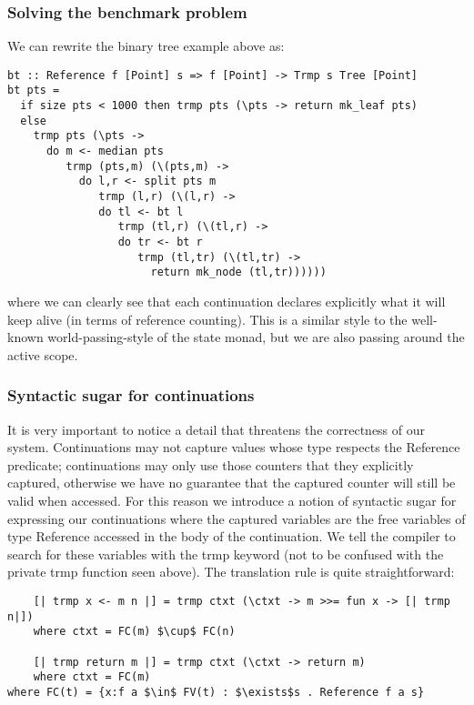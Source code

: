 \subsubsection{Solving the benchmark problem}

We can rewrite the binary tree example above as:

\begin{lstlisting}
bt :: Reference f [Point] s => f [Point] -> Trmp s Tree [Point]
bt pts =
  if size pts < 1000 then trmp pts (\pts -> return mk_leaf pts)
  else
    trmp pts (\pts ->
      do m <- median pts
         trmp (pts,m) (\(pts,m) ->
           do l,r <- split pts m
              trmp (l,r) (\(l,r) -> 
              do tl <- bt l
                 trmp (tl,r) (\(tl,r) ->
                 do tr <- bt r
                    trmp (tl,tr) (\(tl,tr) ->
                      return mk_node (tl,tr))))))
\end{lstlisting}

where we can clearly see that each continuation declares explicitly what it will keep alive (in terms of reference counting). This is a similar style to the well-known world-passing-style of the state monad, but we are also passing around the active scope.

\subsubsection{Syntactic sugar for continuations}

It is very important to notice a detail that threatens the correctness of our system. Continuations may not capture values whose type respects the Reference predicate; continuations may only use those counters that they explicitly captured, otherwise we have no guarantee that the captured counter will still be valid when accessed.
For this reason we introduce a notion of syntactic sugar for expressing our continuations where the captured variables are the free variables of type Reference accessed in the body of the continuation. We tell the compiler to search for these variables with the trmp keyword (not to be confused with the private trmp function seen above).
The translation rule is quite straightforward:

\begin{lstlisting}
	[| trmp x <- m n |] = trmp ctxt (\ctxt -> m >>= fun x -> [| trmp n|])	
	where ctxt = FC(m) $\cup$ FC(n)

	[| trmp return m |] = trmp ctxt (\ctxt -> return m)
	where ctxt = FC(m)
where FC(t) = {x:f a $\in$ FV(t) : $\exists$s . Reference f a s}
\end{lstlisting}

